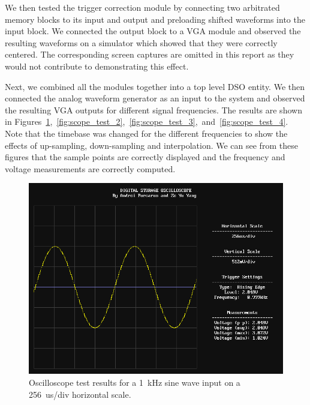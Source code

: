 \documentclass[journal]{IEEEtran}
\begin{document}
We then tested the trigger correction module by connecting two arbitrated memory blocks to its input and output and preloading shifted waveforms into the input block. We connected the output block to a VGA module and observed the resulting waveforms on a simulator which showed that they were correctly centered. The corresponding screen captures are omitted in this report as they would not contribute to demonstrating this effect.

Next, we combined all the modules together into a top level DSO entity. We then connected the analog waveform generator as an input to the system and observed the resulting VGA outputs for different signal frequencies. The results are shown in Figures~\ref{fig:scope_test_1},~\ref{fig:scope_test_2},~\ref{fig:scope_test_3},~and~\ref{fig:scope_test_4}. Note that the timebase was changed for the different frequencies to show the effects of up-sampling, down-sampling and interpolation. We can see from these figures that the sample points are correctly displayed and the frequency and voltage measurements are correctly computed.

\begin{figure}[!htb]
  \centering
  \includegraphics[width=\columnwidth]{test-results/scope_demo_1kHz.png}
  \caption{Oscilloscope test results for a 1~kHz sine wave input on a 256~us/div horizontal scale.}
  \label{fig:scope_test_1}
\end{figure}
\end{document}
